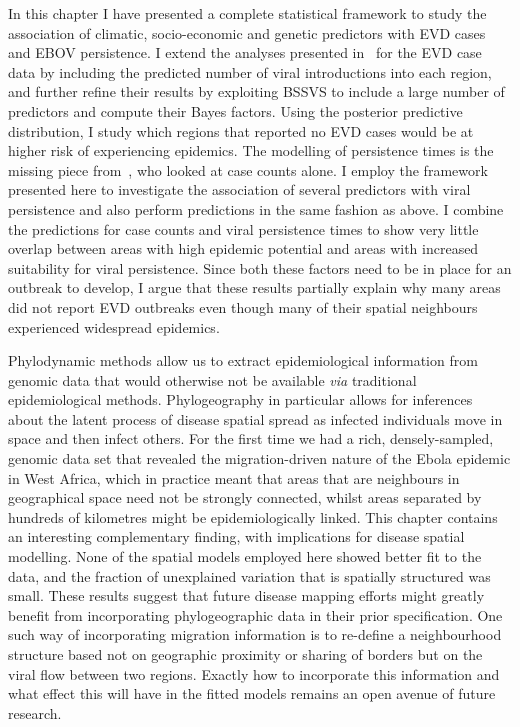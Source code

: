 In this chapter I have presented a complete statistical framework to study the association of climatic, socio-economic and genetic predictors with EVD cases and EBOV persistence.
I extend the analyses presented in~\cite{Dudas2017} for the EVD case data by including the predicted number of viral introductions into each region, and further refine their results by exploiting BSSVS to include a large number of predictors and compute their Bayes factors.
Using the posterior predictive distribution, I study which regions that reported no EVD cases would be at higher risk of experiencing epidemics.
The modelling of persistence times is the missing piece from~\cite{Dudas2017}, who looked at case counts alone.
I employ the framework presented here to investigate the association of several predictors with viral persistence and also perform predictions in the same fashion as above.
I combine the predictions for case counts and viral persistence times to show very little overlap between areas with high epidemic potential and areas with increased suitability for viral persistence.
Since both these factors need to be in place for an outbreak to develop, I argue that these results partially explain why many areas did not report EVD outbreaks even though many of their spatial neighbours experienced widespread epidemics.

Phylodynamic methods allow us to extract epidemiological information from genomic data that would otherwise not be available \textit{via} traditional epidemiological methods.
Phylogeography in particular allows for inferences about the latent process of disease spatial spread as infected individuals move in space and then infect others.
For the first time we had a rich, densely-sampled, genomic data set that revealed the migration-driven nature of the Ebola epidemic in West Africa, which in practice meant that areas that are neighbours in geographical space need not be strongly connected, whilst areas separated by hundreds of kilometres might be epidemiologically linked.
This chapter contains an interesting complementary finding, with implications for disease spatial modelling.
None of the spatial models employed here showed better fit to the data, and the fraction of unexplained variation that is spatially structured was small.
These results suggest that future disease mapping efforts might greatly benefit from incorporating phylogeographic data in their prior specification.
One such way of incorporating migration information is to re-define a neighbourhood structure based not on geographic proximity or sharing of borders but on the viral flow between two regions.
Exactly how to incorporate this information and what effect this will have in the fitted models remains an open avenue of future research.

